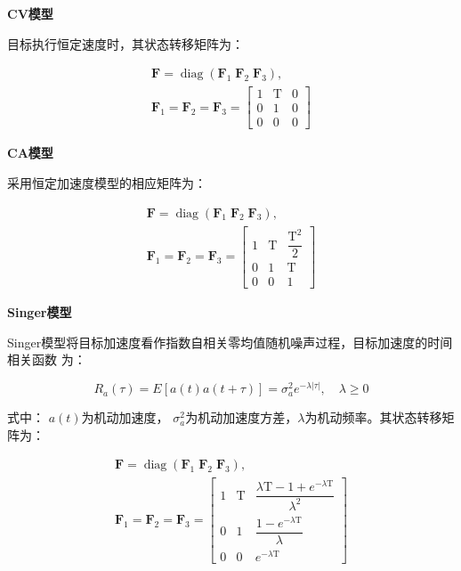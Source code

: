 \documentclass[UTF8,a4paper,zihao=-4]{ctexart}
\begin{document}
\noindent\textbf{CV模型}\par

目标执行恒定速度时，其状态转移矩阵为：


\begin{equation}
\begin{gathered}
\mathbf{F}=\operatorname{diag}(\mathbf{F}_1\;\mathbf{F}_2\;\mathbf{F}_3),\\
\mathbf{F}_1=\mathbf{F}_2=\mathbf{F}_3=\begin{bmatrix}1&\mathrm T&0\\0&1&0\\0&0&0\end{bmatrix}
\end{gathered}
\label{eq:word-4}
\end{equation}


\noindent\textbf{CA模型}\par

采用恒定加速度模型的相应矩阵为：


\begin{equation}
\begin{gathered}
\mathbf{F}=\operatorname{diag}(\mathbf{F}_1\;\mathbf{F}_2\;\mathbf{F}_3),\\
\mathbf{F}_1=\mathbf{F}_2=\mathbf{F}_3=\begin{bmatrix}1&\mathrm T&\dfrac{\mathrm T^2}{2}\\0&1&\mathrm T\\0&0&1\end{bmatrix}
\end{gathered}
\label{eq:word-5}
\end{equation}


\noindent\textbf{Singer模型}\par

Singer模型将目标加速度看作指数自相关零均值随机噪声过程，目标加速度的时间相关函数
为：


\begin{equation}
R_a(\tau)=E[a(t)a(t+\tau)]=\sigma_a^2 e^{-\lambda|\tau|},\quad\lambda\geq0
\label{eq:word-6}
\end{equation}


式中：
\(a(t)\)为机动加速度，
\(\sigma_a^2\)为机动加速度方差，\ensuremath{\lambda}为机动频率。其状态转移矩阵为：


\begin{equation}
\begin{gathered}
\mathbf{F}=\operatorname{diag}(\mathbf{F}_1\;\mathbf{F}_2\;\mathbf{F}_3),\\
\mathbf{F}_1=\mathbf{F}_2=\mathbf{F}_3=\begin{bmatrix}
1&\mathrm T&\dfrac{\lambda\mathrm T-1+e^{-\lambda\mathrm T}}{\lambda^2}\\
0&1&\dfrac{1-e^{-\lambda\mathrm T}}{\lambda}\\
0&0&e^{-\lambda\mathrm T}
\end{bmatrix}
\end{gathered}
\label{eq:word-9}
\end{equation}
\end{document}
